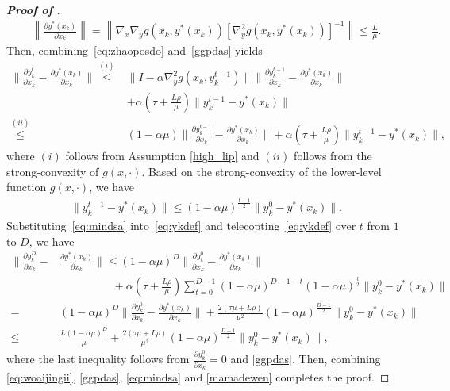 \documentclass{osudissert96}
\begin{document}
\begin{proof}[\bf Proof of ]
\begin{align}
\left\| \frac{\partial y^*(x_k)}{\partial x_k}\right\| =\left\|\nabla_x\nabla_y g(x_k,y^*(x_k))\left[\nabla_y^2 g(x_k,y^*(x_k))\right]^{-1}\right\|\leq\frac{L}{\mu}.
\end{align}
Then, combining~\cref{eq:zhaoposdo} and~\cref{ggpdas} 
yields 
\begin{align}\label{eq:ykdef}
\Big\|\frac{\partial y_k^t}{\partial x_k} -\frac{\partial y^*(x_k)}{\partial x_k} \Big\| \overset{(i)}\leq &\Big\| I-\alpha \nabla_y^2 g(x_k,y_k^{t-1})  \Big\| \Big\| \frac{\partial y_k^{t-1}}{\partial x_k} -\frac{\partial y^*(x_k)}{\partial x_k}\Big\|  \nonumber
\\&+\alpha\left( \tau+ \frac{L\rho}{\mu} \right)\|y_k^{t-1} -y^*(x_k)\| \nonumber
\\\overset{(ii)}\leq &(1-\alpha\mu) \Big\| \frac{\partial y_k^{t-1}}{\partial x_k} -\frac{\partial y^*(x_k)}{\partial x_k}\Big\|  +\alpha\left( \tau+ \frac{L\rho}{\mu} \right)\|y_k^{t-1} -y^*(x_k)\|,
\end{align}
where $(i)$ follows from Assumption \ref{high_lip} and $(ii)$ follows from the strong-convexity of $g(x,\cdot)$. Based on the strong-convexity of the lower-level function $g(x,\cdot)$, we have 
\begin{align}\label{eq:mindsa}
\|y_k^{t-1} -y^*(x_k)\| \leq (1-\alpha\mu)^{\frac{t-1}{2}} \|y^0_k-y^*(x_k)\|.
\end{align}
Substituting~\cref{eq:mindsa} into~\cref{eq:ykdef} and telecopting~\cref{eq:ykdef} over $t$ from $1$ to $D$, we have
\begin{align} \label{mamadewen}
\Big\|\frac{\partial y_k^D}{\partial x_k} -&\frac{\partial y^*(x_k)}{\partial x_k} \Big\| \leq (1-\alpha\mu)^{D}\Big\|\frac{\partial y_k^0}{\partial x_k} -\frac{\partial y^*(x_k)}{\partial x_k} \Big\|  \nonumber
\\&\hspace{2cm}+\alpha\left( \tau+ \frac{L\rho}{\mu} \right)\sum_{t=0}^{D-1} (1-\alpha\mu)^{D-1-t}(1-\alpha\mu)^{\frac{t}{2}} \|y^0_k-y^*(x_k)\| \nonumber
\\=&(1-\alpha\mu)^{D}\Big\|\frac{\partial y_k^0}{\partial x_k} -\frac{\partial y^*(x_k)}{\partial x_k} \Big\| 
+ \frac{2\left(  \tau\mu+ L\rho \right)}{\mu^2}(1-\alpha\mu)^{\frac{D-1}{2}}\|y^0_k-y^*(x_k)\| \nonumber
\\\leq &\frac{L(1-\alpha\mu)^D}{\mu} + \frac{2\left(  \tau\mu+ L\rho \right)}{\mu^2}(1-\alpha\mu)^{\frac{D-1}{2}}\|y^0_k-y^*(x_k)\|,
\end{align}
where the last inequality follows from $\frac{\partial y_k^0}{\partial x_k} =0$ and \cref{ggpdas}. Then, combining \cref{eq:woaijingii}, \cref{ggpdas}, \cref{eq:mindsa} and \cref{mamadewen} completes the proof.
\end{proof}
\end{document}
